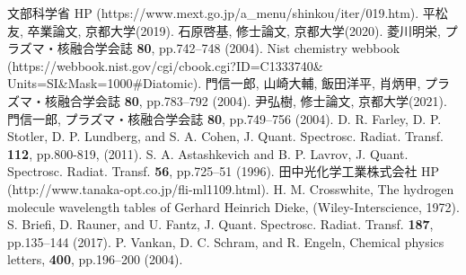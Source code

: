 \begin{thebibliography}{99}
     文部科学省 HP (https://www.mext.go.jp/a\_menu/shinkou/iter/019.htm).
     平松友, 卒業論文, 京都大学(2019).
     石原啓基, 修士論文, 京都大学(2020).
     菱川明栄, プラズマ・核融合学会誌 \textbf{80}, pp.742–748 (2004).
     Nist chemistry webbook (https://webbook.nist.gov/cgi/cbook.cgi?ID=C1333740\&\\Units=SI\&Mask=1000\#Diatomic).
     門信一郎, 山崎大輔, 飯田洋平, 肖炳甲, プラズマ・核融合学会誌 \textbf{80}, pp.783–792 (2004).
     尹弘樹, 修士論文, 京都大学(2021).
     門信一郎, プラズマ・核融合学会誌 \textbf{80}, pp.749–756 (2004).
     D. R. Farley, D. P. Stotler, D. P. Lundberg, and S. A. Cohen, J. Quant. Spectrosc. Radiat. Transf. \textbf{112}, pp.800-819, (2011).
      S. A. Astashkevich and B. P. Lavrov, J. Quant. Spectrosc. Radiat. Transf. \textbf{56}, pp.725–51 (1996).
     田中光化学工業株式会社 HP (http://www.tanaka-opt.co.jp/fli-ml1109.html).
     H. M. Crosswhite, The hydrogen molecule wavelength tables of Gerhard Heinrich Dieke, (Wiley-Interscience, 1972).
     S. Briefi, D. Rauner, and U. Fantz, J. Quant. Spectrosc. Radiat. Transf. \textbf{187}, pp.135–144 (2017).
     P. Vankan, D. C. Schram, and R. Engeln, Chemical physics letters, \textbf{400}, pp.196–200 (2004).
\end{thebibliography}